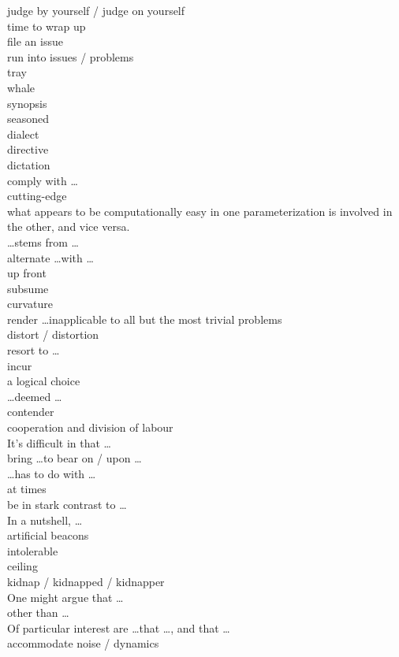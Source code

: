 \documentclass[12pt]{article}
\begin{document}
judge by yourself / judge on yourself \\
time to wrap up \\
file an issue \\
run into issues / problems \\
tray \\
whale \\
synopsis\\
seasoned \\
dialect \\
directive \\
dictation \\
comply with \dots \\
cutting-edge \\
what appears to be computationally easy in one parameterization is involved in the other, and vice versa. \\
\dots stems from \dots \\
alternate \dots with \dots \\
up front \\
subsume \\
curvature \\
render \dots inapplicable to all but the most trivial problems \\
distort / distortion \\
resort to \dots \\
incur \\
a logical choice \\
\dots deemed \dots \\
contender \\
cooperation and division of labour \\
It's difficult in that \dots \\
bring \dots to bear on / upon \dots \\
\dots has to do with \dots \\
at times \\
be in stark contrast to \dots \\
In a nutshell, \dots \\
artificial beacons \\
intolerable \\
ceiling \\
kidnap / kidnapped / kidnapper \\
One might argue that \dots \\
other than \dots \\
Of particular interest are \dots that \dots, and that \dots \\
accommodate noise / dynamics \\
\end{document}
